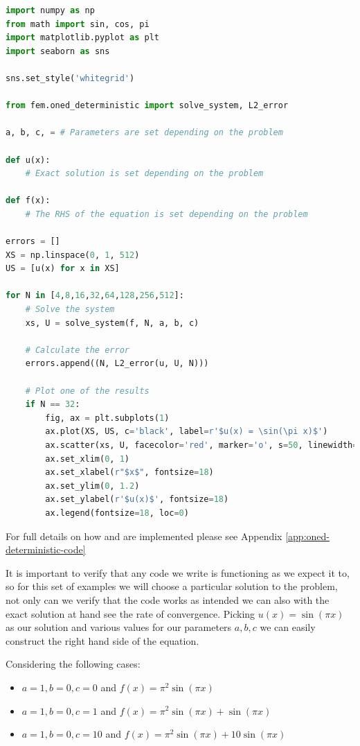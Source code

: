 \begin{lstlisting}[caption={Setup code for the Finite Element Method
                            Implementation},
                   label={code:oned-deterministic},
                   language=Python]
import numpy as np
from math import sin, cos, pi
import matplotlib.pyplot as plt
import seaborn as sns

sns.set_style('whitegrid')

from fem.oned_deterministic import solve_system, L2_error

a, b, c, = # Parameters are set depending on the problem

def u(x):
    # Exact solution is set depending on the problem

def f(x):
    # The RHS of the equation is set depending on the problem

errors = []
XS = np.linspace(0, 1, 512)
US = [u(x) for x in XS]

for N in [4,8,16,32,64,128,256,512]:
    # Solve the system
    xs, U = solve_system(f, N, a, b, c)

    # Calculate the error
    errors.append((N, L2_error(u, U, N)))

    # Plot one of the results
    if N == 32:
        fig, ax = plt.subplots(1)
        ax.plot(XS, US, c='black', label=r'$u(x) = \sin(\pi x)$')
        ax.scatter(xs, U, facecolor='red', marker='o', s=50, linewidth=0, label=r'$u^h(x)$', alpha=1)
        ax.set_xlim(0, 1)
        ax.set_xlabel(r"$x$", fontsize=18)
        ax.set_ylim(0, 1.2)
        ax.set_ylabel(r'$u(x)$', fontsize=18)
        ax.legend(fontsize=18, loc=0)
\end{lstlisting}

For full details on how  and  are
implemented please see Appendix \ref{app:oned-deterministic-code}

It is important to verify that any code we write is functioning as we expect it
to, so for this set of examples we will choose a particular solution to the
problem, not only can we verify that the code works as intended we can also
with the exact solution at hand see the rate of convergence.  Picking $u(x) =
\sin{(\pi x)}$ as our solution and various values for our parameters $a,b,c$ we
can easily construct the right hand side of the equation.

Considering the following cases:
\begin{itemize}
    \item $a = 1, b = 0, c = 0$ and
          $f(x) = \pi^2\sin{(\pi x)}$ \\
    \item $a = 1, b = 0, c = 1$ and
          $f(x) = \pi^2\sin{(\pi x)} + \sin{(\pi x)}$ \\
    \item $a = 1, b = 0, c = 10$ and
          $f(x) = \pi^2\sin{(\pi x)} + 10\sin{(\pi x)}$
\end{itemize}

